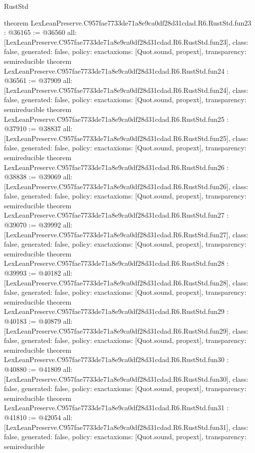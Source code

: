 \begin{lexlean}{RustStd}
\begin{coremodule}
{}
theorem LexLeanPreserve.C957fae7733de71a8e9ca0df28d31cdad.R6.RustStd.fun23 : @36165 := @36560 {
  all: [LexLeanPreserve.C957fae7733de71a8e9ca0df28d31cdad.R6.RustStd.fun23],
  class: false,
  generated: false,
  policy: exact{axioms: [Quot.sound, propext]},
  transparency: semireducible
}
theorem LexLeanPreserve.C957fae7733de71a8e9ca0df28d31cdad.R6.RustStd.fun24 : @36561 := @37909 {
  all: [LexLeanPreserve.C957fae7733de71a8e9ca0df28d31cdad.R6.RustStd.fun24],
  class: false,
  generated: false,
  policy: exact{axioms: [Quot.sound, propext]},
  transparency: semireducible
}
theorem LexLeanPreserve.C957fae7733de71a8e9ca0df28d31cdad.R6.RustStd.fun25 : @37910 := @38837 {
  all: [LexLeanPreserve.C957fae7733de71a8e9ca0df28d31cdad.R6.RustStd.fun25],
  class: false,
  generated: false,
  policy: exact{axioms: [Quot.sound, propext]},
  transparency: semireducible
}
theorem LexLeanPreserve.C957fae7733de71a8e9ca0df28d31cdad.R6.RustStd.fun26 : @38838 := @39069 {
  all: [LexLeanPreserve.C957fae7733de71a8e9ca0df28d31cdad.R6.RustStd.fun26],
  class: false,
  generated: false,
  policy: exact{axioms: [Quot.sound, propext]},
  transparency: semireducible
}
theorem LexLeanPreserve.C957fae7733de71a8e9ca0df28d31cdad.R6.RustStd.fun27 : @39070 := @39992 {
  all: [LexLeanPreserve.C957fae7733de71a8e9ca0df28d31cdad.R6.RustStd.fun27],
  class: false,
  generated: false,
  policy: exact{axioms: [Quot.sound, propext]},
  transparency: semireducible
}
theorem LexLeanPreserve.C957fae7733de71a8e9ca0df28d31cdad.R6.RustStd.fun28 : @39993 := @40182 {
  all: [LexLeanPreserve.C957fae7733de71a8e9ca0df28d31cdad.R6.RustStd.fun28],
  class: false,
  generated: false,
  policy: exact{axioms: [Quot.sound, propext]},
  transparency: semireducible
}
theorem LexLeanPreserve.C957fae7733de71a8e9ca0df28d31cdad.R6.RustStd.fun29 : @40183 := @40879 {
  all: [LexLeanPreserve.C957fae7733de71a8e9ca0df28d31cdad.R6.RustStd.fun29],
  class: false,
  generated: false,
  policy: exact{axioms: [Quot.sound, propext]},
  transparency: semireducible
}
theorem LexLeanPreserve.C957fae7733de71a8e9ca0df28d31cdad.R6.RustStd.fun30 : @40880 := @41809 {
  all: [LexLeanPreserve.C957fae7733de71a8e9ca0df28d31cdad.R6.RustStd.fun30],
  class: false,
  generated: false,
  policy: exact{axioms: [Quot.sound, propext]},
  transparency: semireducible
}
theorem LexLeanPreserve.C957fae7733de71a8e9ca0df28d31cdad.R6.RustStd.fun31 : @41810 := @42054 {
  all: [LexLeanPreserve.C957fae7733de71a8e9ca0df28d31cdad.R6.RustStd.fun31],
  class: false,
  generated: false,
  policy: exact{axioms: [Quot.sound, propext]},
  transparency: semireducible
}
\end{coremodule}
\end{lexlean}
